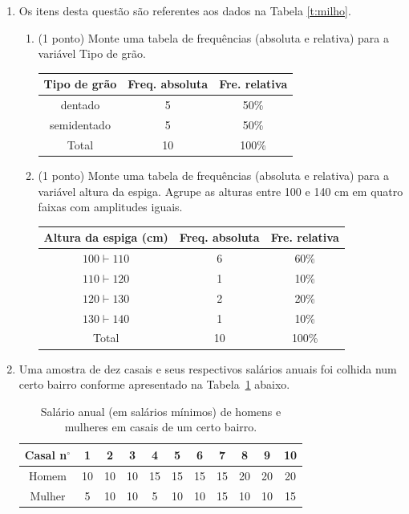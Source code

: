 \documentclass{article}
\begin{document}
\begin{enumerate}
\item Os itens desta questão são referentes aos dados na Tabela \ref{t:milho}.
\begin{enumerate}
	\item (1 ponto) Monte uma tabela de frequências  (absoluta e relativa) para a variável Tipo de grão.\\
	{\color{blue}
	\begin{tabular}{c|cc}
	\hline
	Tipo de grão & Freq. absoluta & Fre. relativa \\
	\hline
	dentado & 5 & 50\% \\
	semidentado & 5 & 50\% \\
	\hline
	Total & 10 & 100\% \\
	\hline
	\end{tabular}
	}
	
	\item (1 ponto) Monte uma tabela de frequências (absoluta e relativa) para a variável altura da espiga. Agrupe as alturas entre 100 e 140 cm em quatro faixas com amplitudes iguais.\\
	{\color{blue}
	\begin{tabular}{c|cc}
	\hline
	Altura da espiga (cm) & Freq. absoluta & Fre. relativa \\
	\hline
	$100 \vdash 110$ & 6 & 60\% \\
	$110 \vdash 120$ & 1 & 10\% \\
	$120 \vdash 130$ & 2 & 20\% \\
	$130 \vdash 140$ & 1 & 10\% \\
	\hline
	Total & 10 & 100\% \\
	\hline
	\end{tabular}	
	}
\end{enumerate}   


\item Uma amostra de dez casais e seus respectivos salários anuais foi colhida num certo bairro conforme apresentado na Tabela~\ref{t:salarios} abaixo.

\begin{table}[h]
	\centering
	\caption{Salário anual (em salários mínimos) de homens e mulheres em casais de um certo bairro.}
	\label{t:salarios}
\begin{tabular}{c|cccccccccc}
	\hline
	Casal n$^\circ$ & 1 & 2 & 3 & 4 & 5 & 6 & 7 & 8 & 9 & 10 \\
	\hline        
	Homem & 10 & 10 & 10 & 15 & 15 & 15 & 15 & 20 & 20 & 20 \\
	Mulher & 5 & 10 & 10 & 5 & 10 & 10 & 15 & 10 & 10 & 15 \\
	\hline
\end{tabular}	
\end{table}


\end{enumerate}
\end{document}
